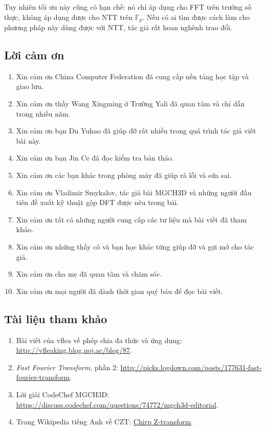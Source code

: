 \documentclass[11pt]{article}
\begin{document}
Tuy nhiên tối ưu này cũng có hạn chế: nó chỉ áp dụng cho FFT trên trường số
thực, không áp dụng được cho NTT trên \(\mathbb F_p\). Nếu có ai tìm được cách
làm cho phương pháp này dùng được với NTT, tác giả rất hoan nghênh trao đổi.

\subsection*{Lời cảm ơn}

\begin{enumerate}
  \item Xin cảm ơn China Computer Federation đã cung cấp nền tảng học tập và
  giao lưu.
  \item Xin cảm ơn thầy Wang Xingming ở Trường Yali đã quan tâm và chỉ dẫn
  trong nhiều năm.
  \item Xin cảm ơn bạn Du Yuhao đã giúp đỡ rất nhiều trong quá trình tác giả
  viết bài này.
  \item Xin cảm ơn bạn Jin Ce đã đọc kiểm tra bản thảo.
  \item Xin cảm ơn các bạn khác trong phòng máy đã giúp rà lỗi và sửa sai.
  \item Xin cảm ơn Vladimir Smykalov, tác giả bài MGCH3D và những người đầu
  tiên đề xuất kỹ thuật gộp DFT được nêu trong bài.
  \item Xin cảm ơn tất cả những người cung cấp các tư liệu mà bài viết đã tham
  khảo.
  \item Xin cảm ơn những thầy cô và bạn học khác từng giúp đỡ và gợi mở cho
  tác giả.
  \item Xin cảm ơn cha mẹ đã quan tâm và chăm sóc.
  \item Xin cảm ơn mọi người đã dành thời gian quý báu để đọc bài viết.
\end{enumerate}

\subsection*{Tài liệu tham khảo}

\begin{enumerate}
  \item Bài viết của vflea về phép chia đa thức và ứng dụng:
  \href{http://vfleaking.blog.uoj.ac/blog/87}{http://vfleaking.blog.uoj.ac/blog/87}.
  \item \emph{Fast Fourier Transform}, phần 2:
  \href{http://picks.logdown.com/posts/177631-fast-fourier-transform}{http://picks.logdown.com/posts/177631-fast-fourier-transform}.
  \item Lời giải CodeChef MGCH3D:
  \href{https://discuss.codechef.com/questions/74772/mgch3d-editorial}{https://discuss.codechef.com/questions/74772/mgch3d-editorial}.
  \item Trang Wikipedia tiếng Anh về CZT:
  \href{https://en.wikipedia.org/wiki/Chirp_Z-transform}{Chirp Z-transform}.
\end{enumerate}
\end{document}
